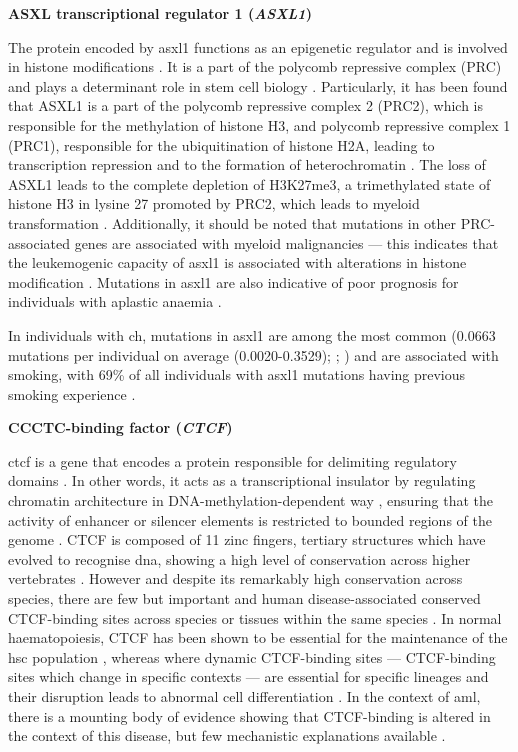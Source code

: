 \noindent \textbf{ASXL transcriptional regulator 1 (\textit{ASXL1})}

The protein encoded by \ac{asxl1} functions as an epigenetic regulator and is involved in histone modifications \cite{Fisher2003-eh}. It is a part of the polycomb repressive complex (PRC) and plays a determinant role in stem cell biology \cite{Avgustinova2016-uz}. Particularly, it has been found that ASXL1 is a part of the polycomb repressive complex 2 (PRC2), which is responsible for the methylation of histone H3, and polycomb repressive complex 1 (PRC1), responsible for the ubiquitination of histone H2A, leading to transcription repression and to the formation of heterochromatin \cite{Schwartz2013-fg,Bowman2018-cd}. The loss of ASXL1 leads to the complete depletion of H3K27me3, a trimethylated state of histone H3 in lysine 27 promoted by PRC2, which leads to myeloid transformation \cite{Abdel-Wahab2012-xt}. Additionally, it should be noted that mutations in other PRC-associated genes are associated with myeloid malignancies --- this indicates that the leukemogenic capacity of \ac{asxl1} is associated with alterations in histone modification \cite{Haferlach2014-bh,Fujino2020-kc}. Mutations in \ac{asxl1} are also indicative of poor prognosis for individuals with aplastic anaemia \cite{Yoshizato2015-th}.

In individuals with \ac{ch}, mutations in \ac{asxl1} are among the most common \cite{Jaiswal2014-rl,Genovese2014-eu,Zink2017-zi,Bolton2020-ct,Coombs2017-ph,Acuna-Hidalgo2017-ng,Desai2018-pj,Young2016-du,Young2019-rz} (0.0663 mutations per individual on average (0.0020-0.3529); ; ) and are associated with smoking, with 69\% of all individuals with \ac{asxl1} mutations having previous smoking experience \cite{Dawoud2020-af}. 

\noindent \textbf{CCCTC-binding factor (\textit{CTCF})}

\Ac{ctcf} is a gene that encodes a protein responsible for delimiting regulatory domains \cite{Jeong2004-xv}. In other words, it acts as a transcriptional insulator by regulating chromatin architecture in DNA-methylation-dependent way \cite{Wang2012-gj}, ensuring that the activity of enhancer or silencer elements is restricted to bounded regions of the genome \cite{Kuhn2003-zj}. CTCF is composed of 11 zinc fingers, tertiary structures which have evolved to recognise \ac{dna}, showing a high level of conservation across higher vertebrates \cite{Filippova1996-lz}. However and despite its remarkably high conservation across species, there are few but important and human disease-associated conserved CTCF-binding sites across species \cite{Martin2011-iz} or tissues within the same species \cite{Azazi2020-lr}. In normal haematopoiesis, CTCF has been shown to be essential for the maintenance of the \ac{hsc} population \cite{Kim2017-of}, whereas where dynamic CTCF-binding sites --- CTCF-binding sites which change in specific contexts --- are essential for specific lineages and their disruption leads to abnormal cell differentiation \cite{Qi2021-do}. In the context of \ac{aml}, there is a mounting body of evidence showing that CTCF-binding is altered in the context of this disease, but few mechanistic explanations available \cite{Qiu2020-wn}.

